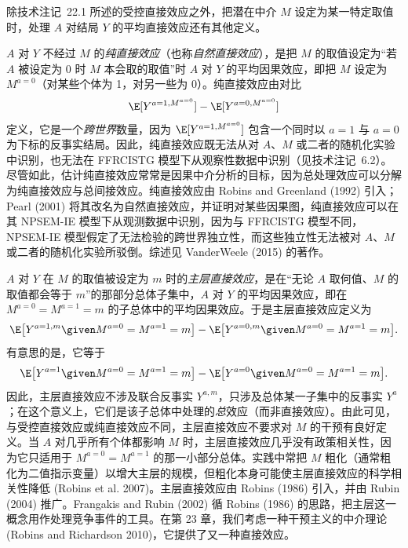\begin{techpoint}[纯直接效应与主层直接效应]
除技术注记~22.1 所述的受控直接效应之外，把潜在中介 $M$ 设定为某一特定取值时，处理 $A$ 对结局 $Y$ 的平均直接效应还有其他定义。

$A$ 对 $Y$ 不经过 $M$ 的\emph{纯直接效应}（也称\emph{自然直接效应}），是把 $M$ 的取值设定为“若 $A$ 被设定为 0 时 $M$ 本会取的取值”时 $A$ 对 $Y$ 的平均因果效应，即把 $M$ 设定为 $M^{a=0}$（对某些个体为 1，对另一些为 0）。纯直接效应由对比
\[
\E[Y^{a=1,M^{a=0}}]-\E[Y^{a=0,M^{a=0}}]
\]
定义，它是一个\emph{跨世界}数量，因为 $\E[Y^{a=1,M^{a=0}}]$ 包含一个同时以 $a=1$ 与 $a=0$ 为下标的反事实结局。因此，纯直接效应既无法从对 $A$、$M$ 或二者的随机化实验中识别，也无法在 FFRCISTG 模型下从观察性数据中识别（见技术注记~6.2）。尽管如此，估计纯直接效应常常是因果中介分析的目标，因为总处理效应可以分解为纯直接效应与总间接效应。纯直接效应由 Robins and Greenland (1992) 引入；Pearl (2001) 将其改名为自然直接效应，并证明对某些因果图，纯直接效应可以在其 NPSEM-IE 模型下从观测数据中识别，因为与 FFRCISTG 模型不同，NPSEM-IE 模型假定了无法检验的跨世界独立性，而这些独立性无法被对 $A$、$M$ 或二者的随机化实验所驳倒。综述见 VanderWeele (2015) 的著作。

$A$ 对 $Y$ 在 $M$ 的取值被设定为 $m$ 时的\emph{主层直接效应}，是在“无论 $A$ 取何值、$M$ 的取值都会等于 $m$”的那部分总体子集中，$A$ 对 $Y$ 的平均因果效应，即在 $M^{a=0}=M^{a=1}=m$ 的子总体中的平均因果效应。于是主层直接效应定义为
\[
\E\bigl[Y^{a=1,m}\given M^{a=0}=M^{a=1}=m\bigr]-\E\bigl[Y^{a=0,m}\given M^{a=0}=M^{a=1}=m\bigr].
\]
有意思的是，它等于
\[
\E\bigl[Y^{a=1}\given M^{a=0}=M^{a=1}=m\bigr]-\E\bigl[Y^{a=0}\given M^{a=0}=M^{a=1}=m\bigr].
\]
因此，主层直接效应不涉及联合反事实 $Y^{a,m}$，只涉及总体某一子集中的反事实 $Y^{a}$；在这个意义上，它们是该子总体中处理的\emph{总}效应（而非直接效应）。由此可见，与受控直接效应或纯直接效应不同，主层直接效应不要求对 $M$ 的干预有良好定义。当 $A$ 对几乎所有个体都影响 $M$ 时，主层直接效应几乎没有政策相关性，因为它只适用于 $M^{a=0}=M^{a=1}$ 的那一小部分总体。实践中常把 $M$ 粗化（通常粗化为二值指示变量）以增大主层的规模，但粗化本身可能使主层直接效应的科学相关性降低 (Robins et al. 2007)。主层直接效应由 Robins (1986) 引入，并由 Rubin (2004) 推广。Frangakis and Rubin (2002) 循 Robins (1986) 的思路，把主层这一概念用作处理竞争事件的工具。在第 23 章，我们考虑一种干预主义的中介理论 (Robins and Richardson 2010)，它提供了又一种直接效应。
\end{techpoint}

